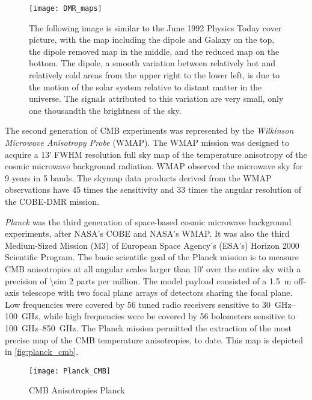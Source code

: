 \begin{figure}
        \centering
        \texttt{[image: DMR\_maps]}
        \caption{The following image is similar to the June 1992 Physics
        Today cover picture, with the map including the dipole and Galaxy
        on the top, the dipole removed map in the middle, and the reduced
        map on the bottom. The dipole, a smooth variation between
        relatively hot and relatively cold areas from the upper right to
        the lower left, is due to the motion of the solar system relative
        to distant matter in the universe. The signals attributed to this
        variation are very small, only one thousandth the brightness of the
        sky.}
        \label{fig:dmr_maps}
\end{figure}

The second generation of CMB experiments was represented by the
\emph{Wilkinson Microwave Anisotropy Probe} (WMAP). The WMAP mission was
designed to acquire a \ang{;13;} FWHM resolution full sky
map of the temperature anisotropy of the cosmic microwave background
radiation. WMAP observed the microwave sky for \num{9} years in \num{5}
bands. The skymap data products derived from the WMAP observations have
\num{45} times the sensitivity and \num{33} times the angular resolution
of the COBE-DMR mission.

\emph{Planck} was the third generation of space-based cosmic microwave background
experiments, after NASA's COBE and NASA's WMAP. It was also the third
Medium-Sized Mission (M3) of European Space Agency's (ESA's) Horizon 2000
Scientific Program. The basic scientific goal of the Planck mission is to
measure CMB anisotropies at all angular scales larger than \ang{;10;} 
over the entire sky with a precision of \num{\sim 2} parts per million.
The model payload consisted of a \SI{1.5}{\meter} off-axis telescope with
two focal plane arrays of detectors sharing the focal plane. Low frequencies
were covered by \num{56} tuned radio receivers sensitive to
\SIrange{30}{100}{\giga\hertz}, while high frequencies were be covered by
\num{56} bolometers sensitive to \SIrange{100}{850}{\giga\hertz}.
The Planck mission permitted the extraction of the most precise map of the
CMB temperature anisotropies, to date. This map is depicted in 
\autoref{fig:planck_cmb}. 

\begin{figure}
        \centering
        \texttt{[image: Planck\_CMB]}
        \caption{CMB Anisotropies Planck}
        \label{fig:planck_cmb}
\end{figure}

